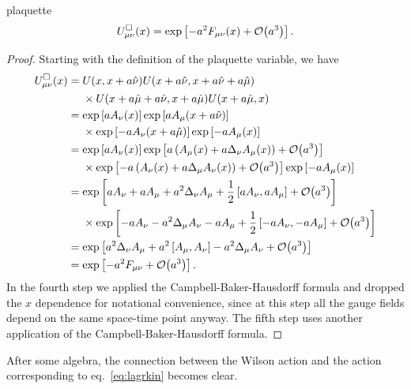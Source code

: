 \begin{proposition}{}{plaquette}
$$
U^\Box_{\mu\nu}(x)=\exp\left[-a^2F_{\mu\nu}(x)+\order{a^3}\right].
$$
  \begin{proof}
    Starting with the definition of the plaquette variable, we have
    \begin{equation*}\begin{aligned}
      U^\Box_{\mu\nu}(x)&=U(x,x+a\hat\nu)U(x+a\hat\nu,x+a\hat\nu+a\hat\mu)\\
               &~~~~\times U(x+a\hat\mu+a\hat\nu,x+a\hat\mu)U(x+a\hat\mu,x)\\
            &=\exp\left[aA_\nu(x)\right]
              \exp\left[aA_\mu(x+a\hat\nu)\right]\\
               &~~~~\times\exp\left[-aA_\nu(x+a\hat\mu)\right]
                \exp\left[-aA_\mu(x)\right]\\
            &=\exp\left[aA_\nu(x)\right]
               \exp\left[a\left( A_\mu(x)+a\Delta_\nu A_\mu(x) \right)
                                 +\order{a^3}\right]\\
               &~~~~\times
               \exp\left[-a\left(A_\nu(x)+a\Delta_\mu A_\nu(x) \right)
                                 +\order{a^3}\right]
               \exp\left[-aA_\mu(x)\right]\\
            &=\exp\left[aA_\nu+aA_\mu+a^2\Delta_\nu A_\mu
                 +\frac{1}{2}\left[aA_\nu,aA_\mu\right]
                 +\order{a^3}\right]\\
            &~~~~\times\exp\left[-aA_\nu-a^2\Delta_\mu A_\nu-aA_\mu
                 +\frac{1}{2}\left[-aA_\nu,-aA_\mu\right]
                 +\order{a^3}\right]\\
            &=\exp\left[a^2\Delta_\nu A_\mu+a^2\left[A_\mu,A_\nu\right]
                 -a^2\Delta_\mu A_\nu+\order{a^3}\right]\\
            &=\exp\left[-a^2F_{\mu\nu}+\order{a^3}\right].
    \end{aligned}\end{equation*}
    In the fourth step we applied the Campbell-Baker-Hausdorff formula and
    dropped the $x$ dependence for notational convenience, since at this
    step all the gauge fields depend on the same space-time point anyway.
    The fifth step uses another application of the Campbell-Baker-Hausdorff
    formula.
  \end{proof}
\end{proposition}
After some algebra, the connection between the Wilson action and the action
corresponding to eq.~\eqref{eq:lagrkin} becomes clear.
